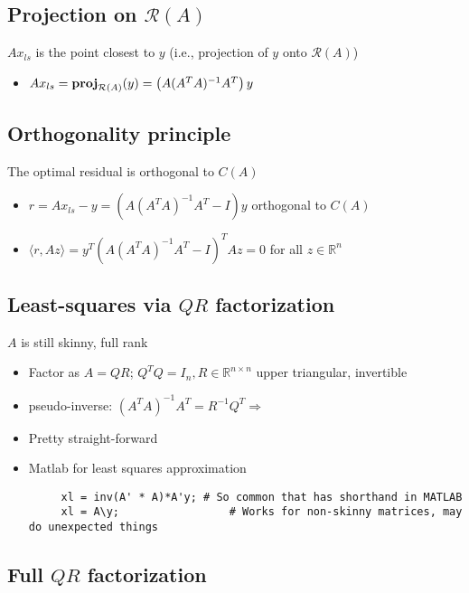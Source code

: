 \documentclass[10pt,letterpaper]{article}
\begin{document}
\subsection{Projection on $\mathcal{R}(A)$}
\label{sec-4_3}

$Ax _{ls}$ is the point closest to $y$ (i.e., projection of $y$ onto $\mathcal{R}(A)$)
\begin{itemize}
\item $A x _{ls} = {\bf proj} _{ \mathcal{R}(A)} (y)= \left(A(A ^{T} A) ^{-1} A ^{T} \right)y$
\end{itemize}
\subsection{Orthogonality principle}
\label{sec-4_4}

The optimal residual is orthogonal to $C(A)$
\begin{itemize}
\item $r = A x _{ls} -y = (A(A ^{T} A) ^{-1} A ^{T} -I)y$ orthogonal to $C(A)$
\item $\langle r, Az \rangle = y ^{T} (A(A ^{T} A) ^{-1} A ^{T} -I) ^{T} Az = 0$ for all $z \in \mathbb{R}^{n}$
\end{itemize}
\subsection{Least-squares via $QR$ factorization}
\label{sec-4_5}

$A$ is still skinny, full rank
\begin{itemize}
\item Factor as $A=QR$; $Q^TQ=I_n, R \in \mathbb{R}^{n\times n}$ upper triangular, invertible
\item pseudo-inverse: $(A ^{T} A) ^{-1} A ^{T} = R ^{-1} Q ^{T} \Rightarrow$ 
\item Pretty straight-forward
\item Matlab for least squares approximation
\begin{verbatim}
     xl = inv(A' * A)*A'y; # So common that has shorthand in MATLAB
     xl = A\y;                 # Works for non-skinny matrices, may do unexpected things
\end{verbatim}

\end{itemize}
\subsection{Full $QR$ factorization}
\label{sec-4_6}
\end{document}
